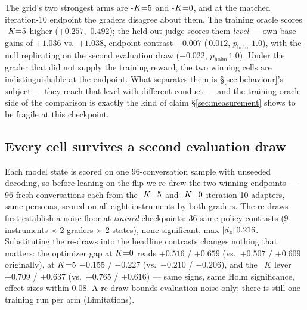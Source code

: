 The grid's two strongest arms are \GRPO-$K{=}5$ and \PTO-$K{=}0$, and at the matched iteration-10
endpoint the graders disagree about them. The training oracle scores \GRPO-$K{=}5$ higher
($+0.257$, \dz\,$0.492$); the held-out judge scores them \emph{level} --- own-base gains of
$+1.036$ vs.\ $+1.038$, endpoint contrast $+0.007$ (\dz\,$0.012$, $p_{\text{holm}}\,1.0$), with
the null replicating on the second evaluation draw ($-0.022$, $p_{\text{holm}}\,1.0$). Under the
grader that did not supply the training reward, the two winning cells are indistinguishable at
the endpoint. What separates them is \S\ref{sec:behaviour}'s subject --- they reach that level
with different conduct --- and the training-oracle side of the comparison is exactly the kind of
claim \S\ref{sec:measurement} shows to be fragile at this checkpoint.

\subsection{Every cell survives a second evaluation draw}

Each model state is scored on one 96-conversation sample with unseeded decoding, so before
leaning on the flip we re-drew the two winning endpoints --- 96 fresh conversations each from the
\GRPO-$K{=}5$ and \PTO-$K{=}0$ iteration-10 adapters, same personas, scored on all eight instruments
by both graders. The re-draws first establish a noise floor at \emph{trained} checkpoints: 36
same-policy contrasts (9 instruments $\times$ 2 graders $\times$ 2 states), none significant,
max $|d_z|\,0.216$. Substituting the re-draws into the headline contrasts changes nothing that
matters: the optimizer gap at $K{=}0$ reads $+0.516$ / $+0.659$ (vs.\ $+0.507$ / $+0.609$
originally), at $K{=}5$ $-0.155$ / $-0.227$ (vs.\ $-0.210$ / $-0.206$), and the \GRPO\ $K$ lever
$+0.709$ / $+0.637$ (vs.\ $+0.765$ / $+0.616$) --- same signs, same Holm significance, effect
sizes within $0.08$. A re-draw bounds evaluation noise only; there is still one training run per
arm (Limitations).
